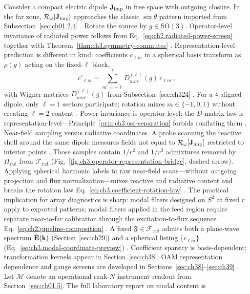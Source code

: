 Consider a compact electric dipole \(\mathbf{J}_{\mathrm{imp}}\) in free space with outgoing closure. In the far zone, \(\mathcal{R}_\omega[\mathbf{J}_{\mathrm{imp}}]\) approaches the classic \(\sin\theta\) pattern imported from Subsection~\ref{sec:ch01.2.4} . Rotate the source by \(g\in\mathrm{SO}(3)\). Operator-level invariance of radiated power follows from Eq.~\eqref{eq:ch2.radiated-power-screen} together with Theorem~\ref{thm:ch3.symmetry-commutes} . Representation-level prediction is different in kind: coefficients \(c_{\ell m}\) in a spherical basis transform as \(\rho(g)\) acting on the fixed-\(\ell\) block,
\begin{equation}
\label{eq:ch3.dipole-coefficient-rotation}
c'_{\ell m}
=
\sum_{m'=-\ell}^{\ell}
D^{(\ell)}_{m m'}(g)\,c_{\ell m'},
\end{equation}
with Wigner matrices \(D^{(\ell)}_{m m'}(g)\) from Subsection~\ref{sec:ch324} . For a \(z\)-aligned dipole, only \(\ell=1\) sectors participate; rotation mixes \(m\in\{-1,0,1\}\) without creating \(\ell=2\) content . Power invariance is operator-level; the \(D\)-matrix law is representation-level---Principle~\ref{prin:ch3.osr-separation} forbids conflating them .
Near-field sampling versus radiative coordinates. A probe scanning the reactive shell around the same dipole measures fields not equal to \(\mathcal{R}_\omega[\mathbf{J}_{\mathrm{imp}}]\) restricted to interior points . Those samples contain \(1/r^2\) and \(1/r^3\) admixtures removed by \(\Pi_{\mathrm{rad}}\) from \(\mathcal{F}_{\mathrm{rad}}\) (Fig.~\ref{fig:ch3.operator-representation-bridge}, dashed arrow). Applying spherical harmonic labels to raw near-field scans---without outgoing projection and flux normalization---mixes reactive and radiative content and breaks the rotation law Eq.~\eqref{eq:ch3.coefficient-rotation-law} . The practical implication for array diagnostics is sharp: modal filters designed on \(S^{2}\) at fixed \(r\) apply to exported patterns; modal filters applied in the feed region require separate near-to-far calibration through the excitation-to-flux sequence Eq.~\eqref{eq:ch2.pipeline-composition} .
A fixed \(\mathfrak{F}\in\mathcal{F}_{\mathrm{rad}}\) admits both a plane-wave spectrum \(\tilde{\mathbf{E}}(\mathbf{k})\) (Section~\ref{sec:ch29}) and a spherical listing \(\{c_{\ell m}\}\) (Eq.~\eqref{eq:ch3.modal-coordinate-preview}) . Coefficient sparsity is basis-dependent; transformation kernels appear in Section~\ref{sec:ch38}. OAM representation dependence and gauge screens are developed in Sections~\ref{sec:ch38}--\ref{sec:ch39} .
Let \(\mathcal{M}\) denote an operational rank-$N$ instrument readout from Section~\ref{sec:ch01.5}. The full laboratory report on modal content is
